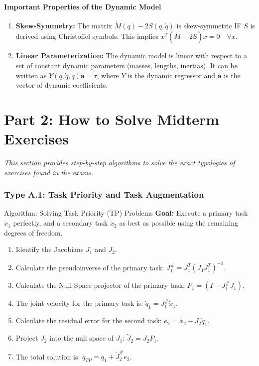 \documentclass[11pt,a4paper]{article}
\begin{document}
\subsection{Important Properties of the Dynamic Model}
\begin{enumerate}
    \item \textbf{Skew-Symmetry:} The matrix $\dot{M}(q) - 2S(q, \dot{q})$ is skew-symmetric IF $S$ is derived using Christoffel symbols. This implies $x^T(\dot{M}-2S)x = 0 \quad \forall x$.
    \item \textbf{Linear Parameterization:} The dynamic model is linear with respect to a set of constant dynamic parameters (masses, lengths, inertias). It can be written as $Y(q, \dot{q}, \ddot{q})\mathbf{a} = \tau$, where $Y$ is the dynamic regressor and $\mathbf{a}$ is the vector of dynamic coefficients.
\end{enumerate}

\newpage
\part*{Part 2: How to Solve Midterm Exercises}
\textit{This section provides step-by-step algorithms to solve the exact typologies of exercises found in the exams.}

\section{Type A.1: Task Priority and Task Augmentation}

{Algorithm: Solving Task Priority (TP) Problems}
\textbf{Goal:} Execute a primary task $\dot{x}_1$ perfectly, and a secondary task $\dot{x}_2$ as best as possible using the remaining degrees of freedom.
\begin{enumerate}
    \item Identify the Jacobians $J_1$ and $J_2$.
    \item Calculate the pseudoinverse of the primary task: $J_1^\# = J_1^T(J_1 J_1^T)^{-1}$.
    \item Calculate the Null-Space projector of the primary task: $P_1 = (I - J_1^\# J_1)$.
    \item The joint velocity for the primary task is: $\dot{q}_1 = J_1^\# \dot{x}_1$.
    \item Calculate the residual error for the second task: $e_2 = \dot{x}_2 - J_2 \dot{q}_1$.
    \item Project $J_2$ into the null space of $J_1$: $\tilde{J}_2 = J_2 P_1$.
    \item The total solution is: $\dot{q}_{TP} = \dot{q}_1 + \tilde{J}_2^\# e_2$.
\end{enumerate}
\end{document}
